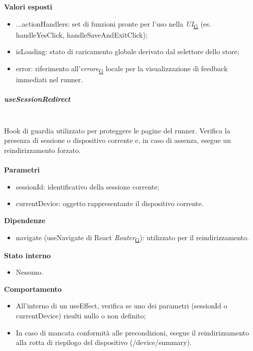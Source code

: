 \documentclass[a4paper,12pt]{article}
\begin{document}
                \textbf{Valori esposti}
                \begin{itemize}
                    \item {\ttfamily ...actionHandlers}: set di funzioni pronte per l'uso nella \textit{UI}\textsubscript{\href{https://atlasteam9.github.io/Atlas/glossario.html\#UI}{G}} (es. {\ttfamily handleYesClick}, {\ttfamily handleSaveAndExitClick});
                    \item {\ttfamily isLoading}: stato di caricamento globale derivato dal selettore dello store;
                    \item {\ttfamily error}: riferimento all'\textit{errore}\textsubscript{\href{https://atlasteam9.github.io/Atlas/glossario.html\#Errore}{G}} locale per la visualizzazione di feedback immediati nel runner.
                \end{itemize}
                
                \subparagraph{useSessionRedirect}\mbox{}\\
                Hook di guardia utilizzato per proteggere le pagine del runner. Verifica la presenza di sessione o dispositivo corrente e, in caso di assenza, esegue un reindirizzamento forzato.\\\\
                \textbf{Parametri}
                \begin{itemize}
                    \item {\ttfamily sessionId}: identificativo della sessione corrente;
                    \item {\ttfamily currentDevice}: oggetto rappresentante il dispositivo corrente.
                \end{itemize}
                \textbf{Dipendenze}
                \begin{itemize}
                    \item {\ttfamily navigate} ({\ttfamily useNavigate} di React \textit{Router}\textsubscript{\href{https://atlasteam9.github.io/Atlas/glossario.html\#Router}{G}}): utilizzato per il reindirizzamento.
                \end{itemize}
                \textbf{Stato interno}
                \begin{itemize}
                    \item Nessuno.
                \end{itemize}
                \textbf{Comportamento}
                \begin{itemize}
                    \item All'interno di un {\ttfamily useEffect}, verifica se uno dei parametri ({\ttfamily sessionId} o {\ttfamily currentDevice}) risulti nullo o non definito;
                    \item In caso di mancata conformità alle precondizioni, esegue il reindirizzamento alla rotta di riepilogo del dispositivo ({\ttfamily /device/summary}).
                \end{itemize}
                
\end{document}
